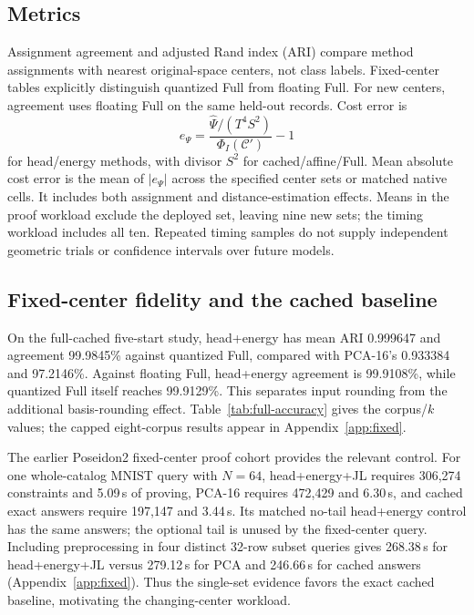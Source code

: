 \subsection{Metrics}
Assignment agreement and adjusted Rand index (ARI) compare method assignments with nearest original-space centers, not class labels. Fixed-center tables explicitly distinguish quantized Full from floating Full. For new centers, agreement uses floating Full on the same held-out records. Cost error is
\begin{equation}
e_\Psi=\frac{\widehat\Psi/(T^4S^2)}{\Phi_I(\mathcal C')}-1
\end{equation}
for head/energy methods, with divisor $S^2$ for cached/affine/Full. Mean absolute cost error is the mean of $|e_\Psi|$ across the specified center sets or matched native cells. It includes both assignment and distance-estimation effects. Means in the proof workload exclude the deployed set, leaving nine new sets; the timing workload includes all ten. Repeated timing samples do not supply independent geometric trials or confidence intervals over future models.

\subsection{Fixed-center fidelity and the cached baseline}\label{sec:results}
On the full-cached five-start study, head+energy has mean ARI 0.999647 and agreement 99.9845\% against quantized Full, compared with PCA-16's 0.933384 and 97.2146\%. Against floating Full, head+energy agreement is 99.9108\%, while quantized Full itself reaches 99.9129\%. This separates input rounding from the additional basis-rounding effect. Table~\ref{tab:full-accuracy} gives the corpus/$k$ values; the capped eight-corpus results appear in Appendix~\ref{app:fixed}.


The earlier Poseidon2 fixed-center proof cohort provides the relevant control. For one whole-catalog MNIST query with $N=64$, head+energy+JL requires 306,274 constraints and 5.09\,s of proving, PCA-16 requires 472,429 and 6.30\,s, and cached exact answers require 197,147 and 3.44\,s. Its matched no-tail head+energy control has the same answers; the optional tail is unused by the fixed-center query. Including preprocessing in four distinct 32-row subset queries gives 268.38\,s for head+energy+JL versus 279.12\,s for PCA and 246.66\,s for cached answers (Appendix~\ref{app:fixed}). Thus the single-set evidence favors the exact cached baseline, motivating the changing-center workload.

